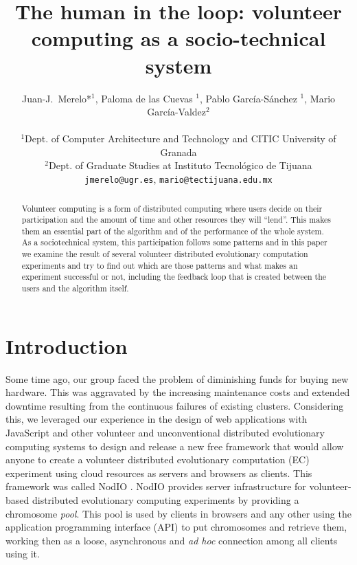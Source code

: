 \documentclass[letterpaper]{article}
\title{The human in the loop: volunteer computing as a socio-technical
system}
\author{Juan-J.~Merelo*$^1$, Paloma de las Cuevas $^1$, Pablo
  Garc\'ia-S\'anchez $^1$, Mario Garc\'ia-Valdez$^2$\\
\mbox{}\\
$^1$Dept. of Computer Architecture and Technology and CITIC University of Granada \\
$^2$Dept. of Graduate Studies at Instituto Tecnol\'ogico de Tijuana \\
{\tt jmerelo@ugr.es}, {\tt mario@tectijuana.edu.mx}}
\begin{document}
\maketitle

\begin{abstract}
Volunteer computing is a form of distributed computing where users
decide on their participation and the amount of time and other resources they will
``lend''. This makes them an essential part of the algorithm and of
the performance of the whole system. As a sociotechnical system, this
participation follows some patterns and in this paper we examine the
result of several volunteer distributed evolutionary computation
experiments and try to find out which are those patterns and what
makes an experiment successful or not, including the feedback loop
that is created between the users and the algorithm itself.
\end{abstract}

\section{Introduction}
\label{introduction}

Some time ago, our group faced the problem of diminishing funds for
buying new hardware. This was aggravated by the increasing maintenance
costs and extended downtime resulting from the continuous failures of
existing clusters.  Considering this, we leveraged our experience in
the design of web applications with JavaScript and other volunteer and
unconventional distributed evolutionary computing systems to design
and release a new free framework that would allow anyone to create a
volunteer distributed evolutionary computation (EC) experiment using
cloud resources as servers and browsers as clients. This framework was
called NodIO \citep{2016arXiv160101607M}. NodIO provides server
infrastructure for volunteer-based distributed evolutionary computing
experiments by providing a chromosome {\em pool}. This pool is used by
clients in browsers and any other using the application programming
interface (API) to put chromosomes and retrieve them, working then as
a loose, asynchronous and {\em ad hoc} connection among all clients
using it. 
\end{document}
